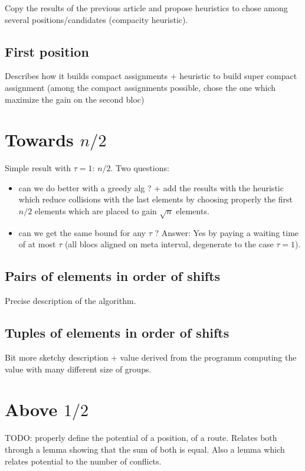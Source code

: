 \documentclass[10pt, conference, letterpaper]{IEEEtran}
\begin{document}
Copy the results of the previous article and propose heuristics to chose among several positions/candidates (compacity heuristic).

\subsection{First position}

Describes how it builds compact assignments 
+ heuristic to build super compact assignment (among the compact assignments
possible, chose the one which maximize the gain on the second bloc)

\section{Towards $n/2$}

Simple result with $\tau = 1$: $n/2$. 
Two questions:
\begin{itemize}
 \item can we do better with a greedy alg ?
+ add the results with the heuristic which reduce collisions with the last elements
by choosing properly the first $n/2$ elements which are placed to gain $\sqrt{n}$ elements. 
\item can we get the same bound for any $\tau$ ?
Answer: Yes by paying a waiting time of at most $\tau$ (all blocs aligned on meta interval,
degenerate to the case $\tau = 1$).
\end{itemize}

\subsection{Pairs of elements in order of shifts}

Precise description of the algorithm. 

\subsection{Tuples of elements in order of shifts}

Bit more sketchy description + value derived from the programm computing the value with many
different size of groups.

\section{Above $1/2$}
TODO: properly define the potential of a position, of a route. Relates both through a lemma 
showing that the sum of both is equal. 
Also a lemma which relates potential to the number of conflicts. 
\end{document}
